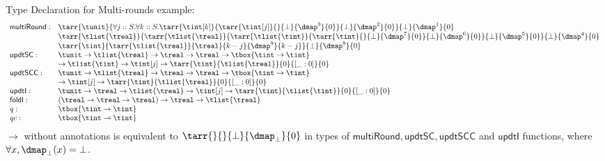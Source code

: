 Type Declaration for Multi-rounds example:
\[
\begin{array}{ll} 
  \mathsf{multiRound} 
  :
    &
    \tarr{\tunit}
    {
      \forall j:: S. \forall k:: S.
      \tarr{\tint[k]}
      {
        \tarr{\tint[j]}
        {
          \empty
        }{\bot}{\dmap^3}{0}
      }{\bot}{\dmap^2}{0}
    }{\bot}{\dmap^1}{0} \\
    &
    \tarr{\tlist{\treal}}
    {
      \tarr{\tlist{\treal}}
      {
        \tarr{\tlist{\tint}}
        {
          \tarr{\tint}
          {
            \empty
          }{\bot}{\dmap^7}{0}
        }{\bot}{\dmap^6}{0} 
      }{\bot}{\dmap^5}{0}
    }{\bot}{\dmap^4}{0}\\
    &
    \tarr{\tint}
    {
      \tarr{\tlist{\treal}}
      {
        \treal
      }{k - j}{\dmap^9}{k - j}
    }{\bot}{\dmap^8}{0}\\

  \mathsf{updtSC} : 
    & \tunit \to \tlist{\treal} \to \treal \to \treal \to \tbox{ \tint \to \tint } \\       
    & \to \tlist{\tint} \to \tint[j] \to \tarr{\tint}{\tlist{\treal}}{0}{[\_ : 0]}{0}\\
  \mathsf{updtSCC} : 
    & \tunit \to \tlist{\treal} \to \treal \to \treal \to \tbox{ \tint \to \tint } \\
    & \to \tint[j] \to \tarr{\tint}{\tlist{\treal}}{0}{[\_ : 0]}{0}\\
  \mathsf{updtI} : & \tunit \to \treal \to \tlist{\treal} \to \tint[j] \to \tarr{\tint}{\tlist{\tint}}{0}{[\_ : 0]}{0}\\
  \mathsf{foldl} : & (\treal \to \treal \to \treal) \to \treal \to \tlist{\treal}\\
  q :              & \tbox{\tint \to \tint}\\
  qc :             & \tbox{\tint \to \tint}\\
\end{array}
\]
$\to$ without annotations is equivalent to $\tarr{}{}{\bot}{\dmap_{\bot}}{0}$ in types of $\mathsf{multiRound}, \mathsf{updtSC}, \mathsf{updtSCC}$ and $ \mathsf{updtI} $ functions, where $\forall x, \dmap_{\bot}(x) = \bot$.


